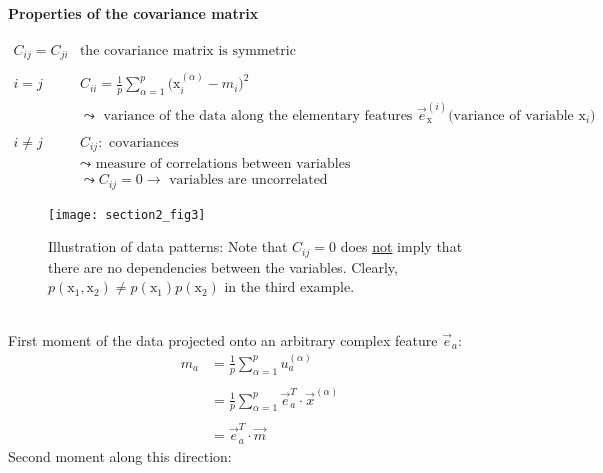 \paragraph{Properties of the covariance matrix}
\[ \begin{array}{ll}
	C_{ij} = C_{ji}
	& \text{the covariance matrix is symmetric} \\\\
	i = j
	& C_{ii} = \frac{1}{p} \sum\limits_{\alpha = 1}^p \Big( 
			\mathrm{x}_i^{(\alpha)} - m_i \Big)^2 \\ 
	& \leadsto \text{ variance of the data along the elementary features }
        \vec{e}_\mathrm{x}^{(i)} \text{(variance of variable } \mathrm{x}_i
		\text{)} \\\\
	i \neq j 
	& C_{ij}: \text{ covariances} \\
	& \leadsto \text{ measure of correlations between variables} \\
	& \leadsto C_{ij} = 0 \rightarrow \text{ variables are uncorrelated} 
\end{array} \]
\begin{figure}[h]
  \centering
\texttt{[image: section2\_fig3]}  
\caption{Illustration of data patterns: Note that $C_{ij} = 0$ does
  \underline{not} imply that there are no dependencies between the
  variables. Clearly, $p(\mathrm{x}_1,\mathrm{x}_2) \neq
  p(\mathrm{x}_1)p(\mathrm{x}_2)$ in the third example.}
  \label{fig:correlations}
\end{figure}
\\
First moment of the data projected onto an arbitrary complex feature $\vec{e}_a$:
\begin{equation} \tag{mean}
	\begin{array}{ll}
		m_a 
		& = \frac{1}{p} \sum\limits_{\alpha = 1}^p u_a^{(\alpha)} \\\\
		& = \frac{1}{p} \sum\limits_{\alpha = 1}^p \vec{e}_a^T \cdot
			\vec{x}^{(\alpha)} \\\\
		& = \vec{e}_a^T \cdot \vec{m}
	\end{array}	
\end{equation}
Second moment along this direction:
